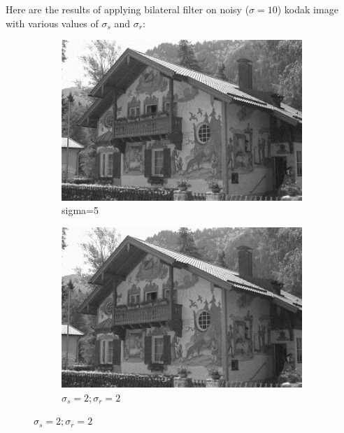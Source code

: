 \documentclass[12pt]{article}
\begin{document}
Here are the results of applying bilateral filter on noisy ($\sigma = 10$) kodak image with various values of $\sigma_s$ and $\sigma_r$:

\begin{figure}[h]
    \centering
    \begin{subfigure}[b]{0.24\textwidth}
        \centering
        \includegraphics[width=\textwidth]{../images/noisy_kodak_10.png}
        \caption{sigma=5}
        \label{Noisy (sigma=10)}
    \end{subfigure}
    \begin{subfigure}[b]{0.24\textwidth}
        \centering
        \includegraphics[width=\textwidth]{../images/filtered_kodak_10_sigma_s_2_sigma_r_2.png}
        \caption{$\sigma_s=2;\sigma_r=2$}
        \label{fig:subfig2}
    \end{subfigure}

\end{figure}
\end{document}
